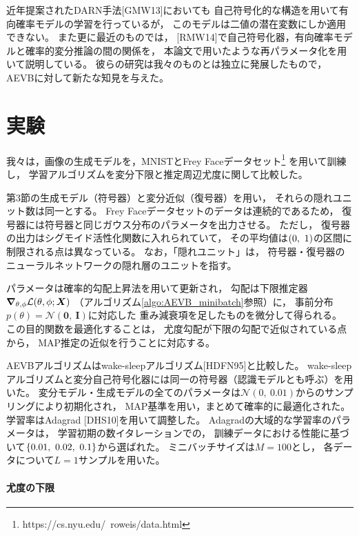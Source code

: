 \documentclass[dvipdfmx, fleqn]{jsarticle}
\begin{document}
近年提案されたDARN手法[GMW13]においても
自己符号化的な構造を用いて有向確率モデルの学習を行っているが，
このモデルは二値の潜在変数にしか適用できない。
また更に最近のものでは，
[RMW14]で自己符号化器，有向確率モデルと確率的変分推論の間の関係を，
本論文で用いたような再パラメータ化を用いて説明している。
彼らの研究は我々のものとは独立に発展したもので，
AEVBに対して新たな知見を与えた。



\section{実験}

我々は，画像の生成モデルを，MNISTとFrey Faceデータセット\footnote{https://cs.nyu.edu/~roweis/data.html}
を用いて訓練し，
学習アルゴリズムを変分下限と推定周辺尤度に関して比較した。

第3節の生成モデル（符号器）と変分近似（復号器）を用い，
それらの隠れユニット数は同一とする。
Frey Faceデータセットのデータは連続的であるため，
復号器には符号器と同じガウス分布のパラメータを出力させる。
ただし，
復号器の出力はシグモイド活性化関数に入れられていて，
その平均値は\(\qty(0,\ 1)\)の区間に制限される点は異なっている。
なお，「隠れユニット」は，
符号器・復号器のニューラルネットワークの隠れ層のユニットを指す。

パラメータは確率的勾配上昇法を用いて更新され，
勾配は下限推定器\(\grad_{\theta, \phi} \mathcal{L}(\theta, \phi; \bm{X})\)%
（アルゴリズム\ref{algo:AEVB_minibatch}参照）に，
事前分布\(p(\theta) = \mathcal{N}(\bm{0},\ \bm{I})\)に対応した
重み減衰項を足したものを微分して得られる。
この目的関数を最適化することは，
尤度勾配が下限の勾配で近似されている点から，
MAP推定の近似を行うことに対応する。

AEVBアルゴリズムはwake-sleepアルゴリズム[HDFN95]と比較した。
wake-sleepアルゴリズムと変分自己符号化器には同一の符号器（認識モデルとも呼ぶ）を用いた。
変分モデル・生成モデルの全てのパラメータは\(\mathcal{N}(0,\ 0.01)\)からのサンプリングにより初期化され，
MAP基準を用い，まとめて確率的に最適化された。
学習率はAdagrad [DHS10]を用いて調整した。
Adagradの大域的な学習率のパラメータは，
学習初期の数イタレーションでの，
訓練データにおける性能に基づいて\(\qty{0.01,\ 0.02,\ 0.1}\)から選ばれた。
ミニバッチサイズは\(M = 100\)とし，
各データについて\(L = 1\)サンプルを用いた。


\paragraph{尤度の下限}
\end{document}
